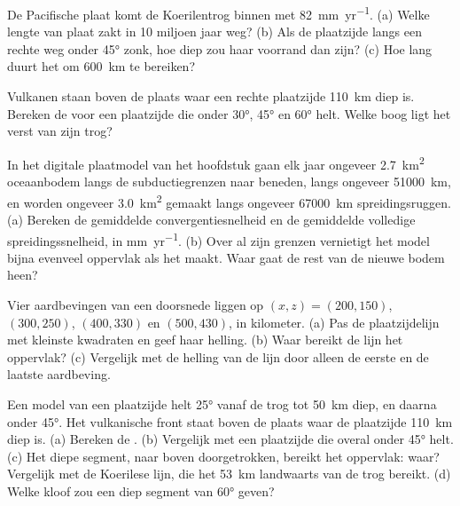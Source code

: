 \begin{exercise}[$\star$]\label{exo:b1:active-margins:2}
De Pacifische plaat komt de Koerilentrog binnen met \qty{82}{mm.yr^{-1}}. (a) Welke lengte van plaat zakt in 10 miljoen jaar weg? (b) Als de plaatzijde langs een rechte weg onder \ang{45} zonk, hoe diep zou haar voorrand dan zijn? (c) Hoe lang duurt het om \qty{600}{km} te bereiken?
\end{exercise}

\begin{exercise}[$\star$]\label{exo:b1:active-margins:3}
Vulkanen staan boven de plaats waar een rechte plaatzijde \qty{110}{km} diep is. Bereken de  voor een plaatzijde die onder \ang{30}, \ang{45} en \ang{60} helt. Welke boog ligt het verst van zijn trog?
\end{exercise}

\begin{exercise}[$\star$]\label{exo:b1:active-margins:4}
In het digitale plaatmodel van het hoofdstuk gaan elk jaar ongeveer \qty{2.7}{km^2} oceaanbodem langs de subductiegrenzen naar beneden, langs ongeveer \qty{51000}{km}, en worden ongeveer \qty{3.0}{km^2} gemaakt langs ongeveer \qty{67000}{km} spreidingsruggen. (a) Bereken de gemiddelde convergentiesnelheid en de gemiddelde volledige spreidingssnelheid, in \unit{mm.yr^{-1}}. (b) Over al zijn grenzen vernietigt het model bijna evenveel oppervlak als het maakt. Waar gaat de rest van de nieuwe bodem heen?
\end{exercise}

\begin{exercise}[$\star\star$]\label{exo:b1:active-margins:5}
Vier aardbevingen van een doorsnede liggen op $(x, z) = (200, 150)$, $(300, 250)$, $(400, 330)$ en $(500, 430)$, in kilometer. (a) Pas de plaatzijdelijn met kleinste kwadraten en geef haar helling. (b) Waar bereikt de lijn het oppervlak? (c) Vergelijk met de helling van de lijn door alleen de eerste en de laatste aardbeving.
\end{exercise}

\begin{exercise}[$\star\star$]\label{exo:b1:active-margins:6}
Een model van een plaatzijde helt \ang{25} vanaf de trog tot \qty{50}{km} diep, en daarna onder \ang{45}. Het vulkanische front staat boven de plaats waar de plaatzijde \qty{110}{km} diep is. (a) Bereken de . (b) Vergelijk met een plaatzijde die overal onder \ang{45} helt. (c) Het diepe segment, naar boven doorgetrokken, bereikt het oppervlak: waar? Vergelijk met de Koerilese lijn, die het \qty{53}{km} landwaarts van de trog bereikt. (d) Welke kloof zou een diep segment van \ang{60} geven?
\end{exercise}

